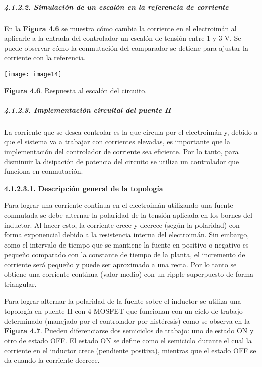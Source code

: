 \documentclass{article} %
\begin{document}
\noindent 

\noindent 
\subparagraph{4.1.2.2. Simulaci\'{o}n de un escal\'{o}n en la referencia de corriente}

\noindent En la \textbf{Figura 4.6} se muestra c\'{o}mo cambia la corriente en el electroim\'{a}n al aplicarle a la entrada del controlador un escal\'{o}n de tensi\'{o}n entre 1 y 3 V. Se puede observar c\'{o}mo la conmutaci\'{o}n del comparador se detiene para ajustar la corriente con la referencia.

\noindent 

\noindent \texttt{[image: image14]}

\noindent \textbf{Figura 4.6}. Respuesta al escal\'{o}n del circuito.

\noindent 
\subparagraph{4.1.2.3. Implementaci\'{o}n circuital del puente H}

\noindent La corriente que se desea controlar es la que circula por el electroim\'{a}n y, debido a que el sistema va a trabajar con corrientes elevadas, es importante que la implementaci\'{o}n del controlador de corriente sea eficiente. Por lo tanto, para disminuir la disipaci\'{o}n de potencia del circuito se utiliza un controlador que funciona en conmutaci\'{o}n. 

\noindent 
{\bf 4.1.2.3.1. Descripci\'{o}n general de la topolog\'{i}a}

\noindent Para lograr una corriente cont\'{i}nua en el electroim\'{a}n utilizando una fuente conmutada se debe alternar la polaridad de la tensi\'{o}n aplicada en los bornes del inductor. Al hacer esto, la corriente crece y decrece (seg\'{u}n la polaridad) con forma exponencial debido a la resistencia interna del electroim\'{a}n. Sin embargo, como el intervalo de tiempo que se mantiene la fuente en positivo o negativo es peque\~{n}o comparado con la constante de tiempo de la planta, el incremento de corriente ser\'{a} peque\~{n}o y puede ser aproximado a una recta. Por lo tanto se obtiene una corriente cont\'{i}nua (valor medio) con un ripple superpuesto de forma triangular. 

\noindent 

\noindent Para lograr alternar la polaridad de la fuente sobre el inductor se utiliza una topolog\'{i}a en puente H con 4 MOSFET que funcionan con un ciclo de trabajo determinado (manejado por el controlador por hist\'{e}resis) como se observa en la \textbf{Figura 4.7}. Pueden diferenciarse dos semiciclos de trabajo: uno de estado ON y otro de estado OFF. El estado ON se define como el semiciclo durante el cual la corriente en el inductor crece (pendiente positiva), mientras que el estado OFF se da cuando la corriente decrece.
\end{document}
